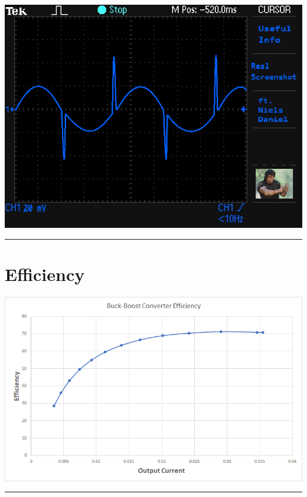 \documentclass[a4paper,11pt]{article}
\begin{document}
\begin{preview}
        \begin{center}
            \includegraphics[width=1\textwidth]{out.png}
        \end{center}
        
\hrule

    \section{Efficiency}
        \begin{center}
            \includegraphics[width=1\textwidth]{efficiency.png}
        \end{center}
    \hrule
\end{preview}
\end{document}
